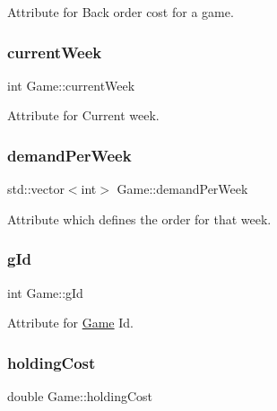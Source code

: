 Attribute for Back order cost for a game. 

\mbox{\label{class_game_a271387bda026cec90a6bb370ce74278d}} 
\subsubsection{\texorpdfstring{current\+Week}{currentWeek}}
{\footnotesize\ttfamily int Game\+::current\+Week\hspace{0.3cm}{\ttfamily [private]}}



Attribute for Current week. 

\mbox{\label{class_game_aea9436a9a1e01665fc10fed6e8273388}} 
\subsubsection{\texorpdfstring{demand\+Per\+Week}{demandPerWeek}}
{\footnotesize\ttfamily std\+::vector$<$int$>$ Game\+::demand\+Per\+Week\hspace{0.3cm}{\ttfamily [private]}}



Attribute which defines the order for that week. 

\mbox{\label{class_game_a448cd197d12e3051ca3946906917eb97}} 
\subsubsection{\texorpdfstring{g\+Id}{gId}}
{\footnotesize\ttfamily int Game\+::g\+Id\hspace{0.3cm}{\ttfamily [private]}}



Attribute for \hyperlink{class_game}{Game} Id. 

\mbox{\label{class_game_a6cb7c7d62127e8378a0dda6793916efd}} 
\subsubsection{\texorpdfstring{holding\+Cost}{holdingCost}}
{\footnotesize\ttfamily double Game\+::holding\+Cost\hspace{0.3cm}{\ttfamily [private]}}



